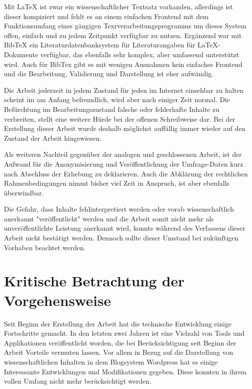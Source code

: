 Mit LaTeX ist zwar ein wissenschaftlicher Textsatz vorhanden, allerdings ist dieser kompiziert und fehlt es an einem einfachen Frontend mit dem Funktionsumfang eines gängigen Texrverarbeitungsprogramms um dieses System offen, einfach und zu jedem Zeitpunkt verfügbar zu nutzen. Ergänzend war mit BibTeX ein Literaturdatenbanksystem für Literaturangaben für LaTeX-Dokumente verfügbar, das ebenfalls sehr komplex, aber umfassend unterstützt wird. Auch für BibTex gibt es mit wenigen Ausnahmen kein einfaches Frontend und die Bearbeitung, Validierung und Darstellung ist eher aufwändig.

Die Arbeit jederzeit in jedem Zustand für jeden im Internet einsehbar zu halten scheint im am Anfang befremdlich, wird aber nach einiger Zeit normal. Die Befürchtung im Bearbeitungszustand falsche oder fehlerhafte Inhalte zu verbreiten, stellt eine weitere Hürde bei der offenen Schreibweise dar. Bei der Erstellung dieser Arbeit wurde deshalb möglichst auffällig immer wieder auf den Zustand der Arbeit hingewiesen.

Als weiteren Nachteil gegenüber der analogen und geschlossenen Arbeit, ist der Aufwand für die Anonymisierung und Veröffentlichung der Umfrage-Daten kurz nach Abschluss der Erhebung zu deklarieren. Auch die Abklärung der rechtlichen Rahmenbedingungen nimmt bisher viel Zeit in Anspruch, ist aber ebenfalls überwindbar.

Die Gefahr, dass Inhalte fehlinterpretiert werden oder vorab wissenschaftlich anerkannt "veröffentlicht" werden und die Arbeit somit nicht mehr als unveröffentlichte Leistung anerkannt wird, konnte während des Verfassens dieser Arbeit nicht bestätigt werden. Dennoch sollte dieser Umstand bei zukünftigen Vorhaben beachtet werden.

\section{Kritische Betrachtung der Vorgehensweise}

Seit Beginn der Erstellung der Arbeit hat die technische Entwicklung einige Fortschritte gemacht. In den letzten zwei Jahren ist eine Vielzahl von Tools und Applikationen veröffentlicht worden, die bei Berücksichtigung seit Beginn der Arbeit Vorteile vermuten lassen. Vor allem in Bezug auf die Darstellung von wissenschaftlichen Inhalten in dem Blogsystem Wordpress hat es einige Interessante Entwicklungen und Modifikationen gegeben. Diese konnten in ihrem vollen Umfang nicht mehr berücksichtigt werden.

